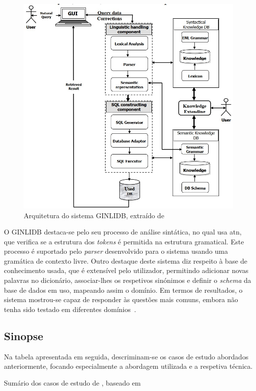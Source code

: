 \begin{figure}[!ht]
    \centering
    \includegraphics[width=.62\textwidth]{ch03/assets/ginlidb_architecture.jpg}
    \caption{Arquitetura do sistema GINLIDB, extraído de~\textcite{ginlidb}}
    \label{fig:ginlidb_architecture}
\end{figure}

O GINLIDB destaca-se pelo seu processo de análise sintática, no qual usa \gls{atn}, que verifica se a estrutura dos \textit{tokens} é permitida na estrutura gramatical. Este processo é suportado pelo \textit{parser} desenvolvido para o sistema usando uma gramática de contexto livre. Outro destaque deste sistema diz respeito à base de conhecimento usada, que é extensível pelo utilizador, permitindo adicionar novas palavras no dicionário, associar-lhes os respetivos sinónimos e definir o \textit{schema} da base de dados em uso, mapeando assim o domínio. Em termos de resultados, o sistema mostrou-se capaz de responder às questões mais comuns, embora não tenha sido testado em diferentes domínios~\parencite{ginlidb}.

\subsection{Sinopse}
Na tabela apresentada em seguida, descriminam-se os casos de estudo abordados anteriormente, focando especialmente a abordagem utilizada e a respetiva técnica.

\begin{table}[!ht]
\caption{Sumário dos casos de estudo de , baseado em \textcite{survey_nlidb}}
\label{tab:study_cases}
\centering
\resizebox{\textwidth}{!}{
\renewcommand{\arraystretch}{1.25}
\footnotesize

}
\end{table}

